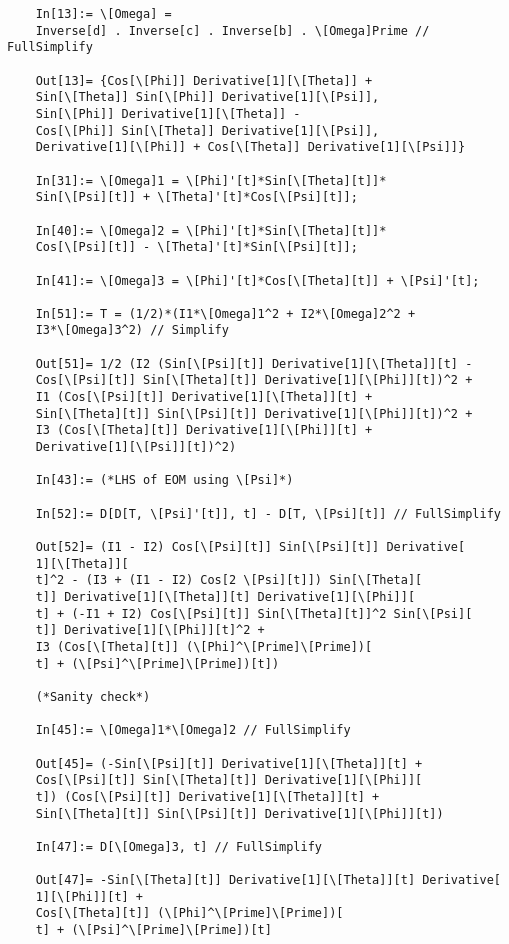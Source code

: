 \documentclass{article}
\theoremstyle{definition}
\begin{document}
\begin{enumerate}[label=(\alph*)]
\begin{lstlisting}
	In[13]:= \[Omega] = 
	Inverse[d] . Inverse[c] . Inverse[b] . \[Omega]Prime // FullSimplify
	
	Out[13]= {Cos[\[Phi]] Derivative[1][\[Theta]] + 
	Sin[\[Theta]] Sin[\[Phi]] Derivative[1][\[Psi]], 
	Sin[\[Phi]] Derivative[1][\[Theta]] - 
	Cos[\[Phi]] Sin[\[Theta]] Derivative[1][\[Psi]], 
	Derivative[1][\[Phi]] + Cos[\[Theta]] Derivative[1][\[Psi]]}
	
	In[31]:= \[Omega]1 = \[Phi]'[t]*Sin[\[Theta][t]]*
	Sin[\[Psi][t]] + \[Theta]'[t]*Cos[\[Psi][t]];
	
	In[40]:= \[Omega]2 = \[Phi]'[t]*Sin[\[Theta][t]]*
	Cos[\[Psi][t]] - \[Theta]'[t]*Sin[\[Psi][t]];
	
	In[41]:= \[Omega]3 = \[Phi]'[t]*Cos[\[Theta][t]] + \[Psi]'[t];
	
	In[51]:= T = (1/2)*(I1*\[Omega]1^2 + I2*\[Omega]2^2 + 
	I3*\[Omega]3^2) // Simplify
	
	Out[51]= 1/2 (I2 (Sin[\[Psi][t]] Derivative[1][\[Theta]][t] - 
	Cos[\[Psi][t]] Sin[\[Theta][t]] Derivative[1][\[Phi]][t])^2 + 
	I1 (Cos[\[Psi][t]] Derivative[1][\[Theta]][t] + 
	Sin[\[Theta][t]] Sin[\[Psi][t]] Derivative[1][\[Phi]][t])^2 + 
	I3 (Cos[\[Theta][t]] Derivative[1][\[Phi]][t] + 
	Derivative[1][\[Psi]][t])^2)
	
	In[43]:= (*LHS of EOM using \[Psi]*)
	
	In[52]:= D[D[T, \[Psi]'[t]], t] - D[T, \[Psi][t]] // FullSimplify
	
	Out[52]= (I1 - I2) Cos[\[Psi][t]] Sin[\[Psi][t]] Derivative[
	1][\[Theta]][
	t]^2 - (I3 + (I1 - I2) Cos[2 \[Psi][t]]) Sin[\[Theta][
	t]] Derivative[1][\[Theta]][t] Derivative[1][\[Phi]][
	t] + (-I1 + I2) Cos[\[Psi][t]] Sin[\[Theta][t]]^2 Sin[\[Psi][
	t]] Derivative[1][\[Phi]][t]^2 + 
	I3 (Cos[\[Theta][t]] (\[Phi]^\[Prime]\[Prime])[
	t] + (\[Psi]^\[Prime]\[Prime])[t])
	
	(*Sanity check*)
	
	In[45]:= \[Omega]1*\[Omega]2 // FullSimplify
	
	Out[45]= (-Sin[\[Psi][t]] Derivative[1][\[Theta]][t] + 
	Cos[\[Psi][t]] Sin[\[Theta][t]] Derivative[1][\[Phi]][
	t]) (Cos[\[Psi][t]] Derivative[1][\[Theta]][t] + 
	Sin[\[Theta][t]] Sin[\[Psi][t]] Derivative[1][\[Phi]][t])
	
	In[47]:= D[\[Omega]3, t] // FullSimplify
	
	Out[47]= -Sin[\[Theta][t]] Derivative[1][\[Theta]][t] Derivative[
	1][\[Phi]][t] + 
	Cos[\[Theta][t]] (\[Phi]^\[Prime]\[Prime])[
	t] + (\[Psi]^\[Prime]\[Prime])[t]
	

\end{lstlisting}
\end{enumerate}
\end{document}

